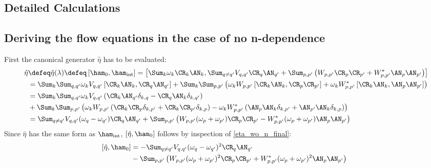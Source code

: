 \begin{appendix}

\chapter{Detailed Calculations}
\thispagestyle{empty}

\section{Deriving the flow equations in the case of no n-dependence}
First the canonical generator $\hat\eta$ has to be evaluated:
\begin{align}
\hat\eta&\defeq\hat\eta(\lambda)\defeq\left[\ham_0,\ham_{\mathrm{int}}\right] = \left[\Sum_k \omega_k \CR_k\AN_k,\Sum_{q\neq q^\prime}V_{q,q^\prime}\CR_q\AN_{q^\prime}+\Sum_{p,p^\prime}\left(W_{p,p^\prime}\CR_p\CR_{p^\prime}+W_{p,p^\prime}^*\AN_p\AN_{p^\prime}\right)\right]  \\ \quad& 
= \Sum_k\Sum_{q,q^\prime}\omega_kV_{q,q^\prime}\left[\CR_k\AN_k,\CR_q\AN_{q^\prime}\right]+\Sum_k\Sum_{p,p^\prime}\left(\omega_k W_{p,p^\prime}\left[\CR_k\AN_k,\CR_p\CR_{p^\prime}\right]+\omega_k W_{p,p^\prime}^*\left[\CR_k\AN_k,\AN_p\AN_{p^\prime}\right]\right) \nonumber \\ \quad& 
=\Sum_k\Sum_{q,q^\prime}\omega_kV_{q,q^\prime}\left(\CR_k\AN_{q^\prime}\delta_{k,q}-\CR_q\AN_k\delta_{k,q^\prime}\right) \nonumber \\ \quad& +\Sum_k\Sum_{p,p^\prime}\left(\omega_k W_{p,p^\prime}\left(\CR_k\CR_p\delta_{k,p^\prime}+\CR_k\CR_{p^\prime}\delta_{k,p}\right)-\omega_k W_{p,p^\prime}^*\left(\AN_p\AN_k\delta_{k,p^\prime}+\AN_{p^\prime}\AN_k\delta_{k,p}\right)\right) \nonumber \\ \quad& = \Sum_{q\neq q^\prime}V_{q,q^\prime}(\omega_q-\omega_{q^\prime})\CR_q\AN_{q^\prime}+\Sum_{p,p^\prime}\left(W_{p,p^\prime}(\omega_p+\omega_{p^\prime})\CR_p\CR_{p^\prime}-W_{p,p^\prime}^*(\omega_p+\omega_{p^\prime})\AN_p\AN_{p^\prime}\right) \label{eta_wo_n_final}
\end{align}
Since $\hat\eta$ has the same form as $\ham_{\mathrm{int}}$, $\left[\hat\eta,\ham_0\right]$ follows by inspection of \ref{eta_wo_n_final}:
\begin{align}
\left[\hat\eta,\ham_0\right]&=-\Sum_{q\neq q^\prime}V_{q,q^\prime}(\omega_q-\omega_{q^\prime})^2\CR_q\AN_{q^\prime}\nonumber \\ \quad& -\Sum_{p,p^\prime}\left(W_{p,p^\prime}(\omega_p+\omega_{p^\prime})^2\CR_p\CR_{p^\prime}+W_{p,p^\prime}^*(\omega_p+\omega_{p^\prime})^2\AN_p\AN_{p^\prime}\right) 

\end{align}
\end{appendix}
